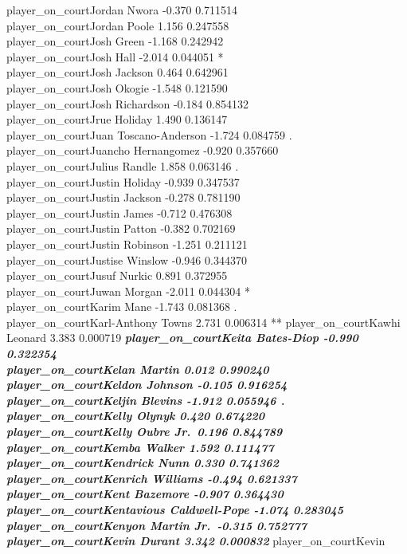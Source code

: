 \documentclass[
  landscape]{article}
\begin{document}
player\_on\_courtJordan Nwora -0.370 0.711514\\
player\_on\_courtJordan Poole 1.156 0.247558\\
player\_on\_courtJosh Green -1.168 0.242942\\
player\_on\_courtJosh Hall -2.014 0.044051 *\\
player\_on\_courtJosh Jackson 0.464 0.642961\\
player\_on\_courtJosh Okogie -1.548 0.121590\\
player\_on\_courtJosh Richardson -0.184 0.854132\\
player\_on\_courtJrue Holiday 1.490 0.136147\\
player\_on\_courtJuan Toscano-Anderson -1.724 0.084759 .\\
player\_on\_courtJuancho Hernangomez -0.920 0.357660\\
player\_on\_courtJulius Randle 1.858 0.063146 .\\
player\_on\_courtJustin Holiday -0.939 0.347537\\
player\_on\_courtJustin Jackson -0.278 0.781190\\
player\_on\_courtJustin James -0.712 0.476308\\
player\_on\_courtJustin Patton -0.382 0.702169\\
player\_on\_courtJustin Robinson -1.251 0.211121\\
player\_on\_courtJustise Winslow -0.946 0.344370\\
player\_on\_courtJusuf Nurkic 0.891 0.372955\\
player\_on\_courtJuwan Morgan -2.011 0.044304 *\\
player\_on\_courtKarim Mane -1.743 0.081368 .\\
player\_on\_courtKarl-Anthony Towns 2.731 0.006314 **
player\_on\_courtKawhi Leonard 3.383 0.000719 \textbf{\emph{
player\_on\_courtKeita Bates-Diop -0.990 0.322354\\
player\_on\_courtKelan Martin 0.012 0.990240\\
player\_on\_courtKeldon Johnson -0.105 0.916254\\
player\_on\_courtKeljin Blevins -1.912 0.055946 .\\
player\_on\_courtKelly Olynyk 0.420 0.674220\\
player\_on\_courtKelly Oubre Jr.~0.196 0.844789\\
player\_on\_courtKemba Walker 1.592 0.111477\\
player\_on\_courtKendrick Nunn 0.330 0.741362\\
player\_on\_courtKenrich Williams -0.494 0.621337\\
player\_on\_courtKent Bazemore -0.907 0.364430\\
player\_on\_courtKentavious Caldwell-Pope -1.074 0.283045\\
player\_on\_courtKenyon Martin Jr.~-0.315 0.752777\\
player\_on\_courtKevin Durant 3.342 0.000832 }} player\_on\_courtKevin
\end{document}
